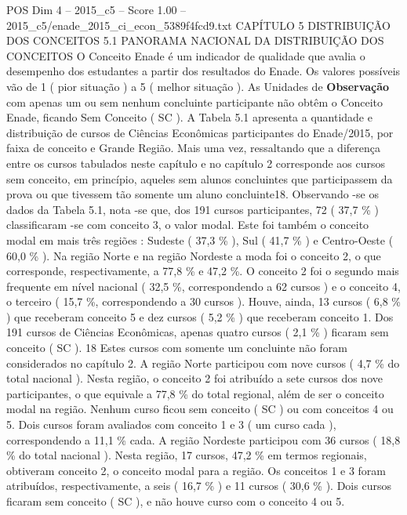 \begin{textsample}{POS Dim 4 – 2015\_c5 – Score 1.00 – 2015\_c5/enade\_2015\_ci\_econ\_5389f4fcd9.txt}  \label{ex:f4_pos_162}
CAPÍTULO 5 DISTRIBUIÇÃO DOS CONCEITOS 5.1 PANORAMA NACIONAL DA DISTRIBUIÇÃO DOS CONCEITOS O Conceito Enade é um indicador de qualidade que avalia o desempenho dos estudantes a partir dos resultados do Enade.
Os valores possíveis vão de 1 ( pior situação ) a 5 ( melhor situação ).
As Unidades de \textbf{Observação} com apenas um ou sem nenhum concluinte participante não obtêm o Conceito Enade, ficando Sem Conceito ( SC ).
A Tabela 5.1 apresenta a quantidade e distribuição de cursos de Ciências Econômicas participantes do Enade/2015, por faixa de conceito e Grande Região.
Mais uma vez, ressaltando que a diferença entre os cursos tabulados neste capítulo e no capítulo 2 corresponde aos cursos sem conceito, em princípio, aqueles sem alunos concluintes que participassem da prova ou que tivessem tão somente um aluno concluinte18.
Observando -se os dados da Tabela 5.1, nota -se que, dos 191 cursos participantes, 72 ( 37,7 \% ) classificaram -se com conceito 3, o valor modal.
Este foi também o conceito modal em mais três regiões : Sudeste ( 37,3 \% ), Sul ( 41,7 \% ) e Centro-Oeste ( 60,0 \% ).
Na região Norte e na região Nordeste a moda foi o conceito 2, o que corresponde, respectivamente, a 77,8 \% e 47,2 \%.
O conceito 2 foi o segundo mais frequente em nível nacional ( 32,5 \%, correspondendo a 62 cursos ) e o conceito 4, o terceiro ( 15,7 \%, correspondendo a 30 cursos ).
Houve, ainda, 13 cursos ( 6,8 \% ) que receberam conceito 5 e dez cursos ( 5,2 \% ) que receberam conceito 1.
Dos 191 cursos de Ciências Econômicas, apenas quatro cursos ( 2,1 \% ) ficaram sem conceito ( SC ). 18 Estes cursos com somente um concluinte não foram considerados no capítulo 2.
A região Norte participou com nove cursos ( 4,7 \% do total nacional ).
Nesta região, o conceito 2 foi atribuído a sete cursos dos nove participantes, o que equivale a 77,8 \% do total regional, além de ser o conceito modal na região.
Nenhum curso ficou sem conceito ( SC ) ou com conceitos 4 ou 5.
Dois cursos foram avaliados com conceito 1 e 3 ( um curso cada ), correspondendo a 11,1 \% cada.
A região Nordeste participou com 36 cursos ( 18,8 \% do total nacional ).
Nesta região, 17 cursos, 47,2 \% em termos regionais, obtiveram conceito 2, o conceito modal para a região.
Os conceitos 1 e 3 foram atribuídos, respectivamente, a seis ( 16,7 \% ) e 11 cursos ( 30,6 \% ).
Dois cursos ficaram sem conceito ( SC ), e não houve curso com o conceito 4 ou 5.

\end{textsample}
